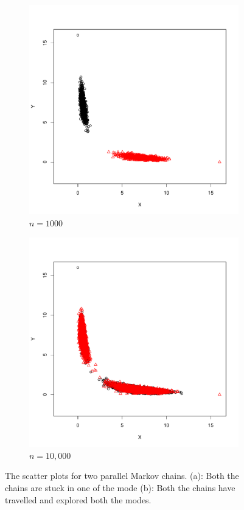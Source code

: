 \documentclass[12pt]{article}
\begin{document}
\begin{figure}[h]
    \centering
    \begin{subfigure}[h]{.4\textwidth}
      \centering
      \includegraphics[width = \textwidth]{plots/boom-sp_1e3.pdf}
      \caption{$n = 1000$}
      \label{subfig:boom-sp_1e3}
    \end{subfigure}
    \begin{subfigure}[h]{.4\textwidth}
      \centering
      \includegraphics[width = \textwidth]{plots/boom-sp_1e4.pdf}
      \caption{$n = 10,000$}
      \label{boom-sp_1e4}
    \end{subfigure}
    \caption{The scatter plots for two parallel Markov chains. (a): Both the chains are stuck in one of the mode (b): Both the chains have travelled and explored both the modes.}
    \label{fig:boom-sp}
\end{figure}
\end{document}
